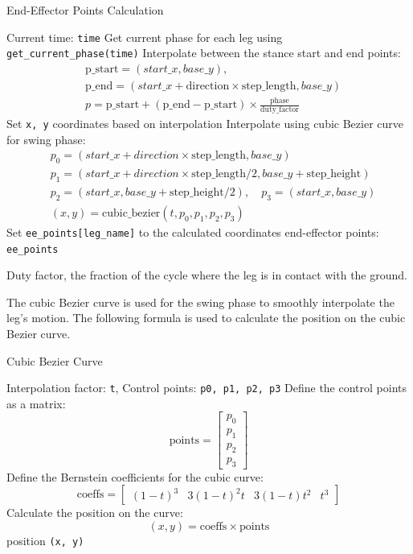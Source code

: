 \documentclass[a4paper,11pt]{article}
\begin{document}
\begin{algorithm}[H]
	\caption{End-Effector Points Calculation}
	\begin{algorithmic}[1]
		\Require Current time: \texttt{time}
		\State Get current phase for each leg using \texttt{get\_current\_phase(time)}
				\State Interpolate between the stance start and end points:
				\begin{align*}
					&\text{p\_start} = (start\_x, base\_y), \\
					&\text{p\_end} = (start\_x + \text{direction} \times \text{step\_length}, base\_y) \\
					&p = \text{p\_start} + (\text{p\_end} - \text{p\_start}) \times \frac{\text{phase}}{\text{duty\_factor}}
				\end{align*}
				\State Set \texttt{x, y} coordinates based on interpolation
			\Else
				\State Interpolate using cubic Bezier curve for swing phase:
				\begin{align*}
					&p_0 = (start\_x + direction \times \text{step\_length}, base\_y) \\
					&p_1 = (start\_x + direction \times \text{step\_length}/2, base\_y + \text{step\_height}) \\
					&p_2 = (start\_x, base\_y + \text{step\_height}/2), \quad p_3 = (start\_x, base\_y) \\
					&(x, y) = \text{cubic\_bezier}(t, p_0, p_1, p_2, p_3)
				\end{align*}
			\EndIf
			\State Set \texttt{ee\_points[leg\_name]} to the calculated coordinates
		\EndFor
		\State \Return end-effector points: \texttt{ee\_points}
	\end{algorithmic}
\end{algorithm}

Duty factor, the fraction of the cycle where the leg is in contact with the ground.

The cubic Bezier curve is used for the swing phase to smoothly interpolate the leg's motion. The following formula is used to calculate the position on the cubic Bezier curve.

\begin{algorithm}[H]
	\caption{Cubic Bezier Curve}
	\begin{algorithmic}[1]
		\Require Interpolation factor: \texttt{t}, Control points: \texttt{p0, p1, p2, p3}
		\State Define the control points as a matrix:
		$$
			\text{points} = \begin{bmatrix} p_0 \\ p_1 \\ p_2 \\ p_3 \end{bmatrix}
		$$
		\State Define the Bernstein coefficients for the cubic curve:
		$$
			\text{coeffs} = \begin{bmatrix} (1-t)^3 & 3(1-t)^2t & 3(1-t)t^2 & t^3 \end{bmatrix}
		$$
		\State Calculate the position on the curve:
		$$
			(x, y) = \text{coeffs} \times \text{points}
		$$
		\State \Return position \texttt{(x, y)}
	\end{algorithmic}
\end{algorithm}
\end{document}
